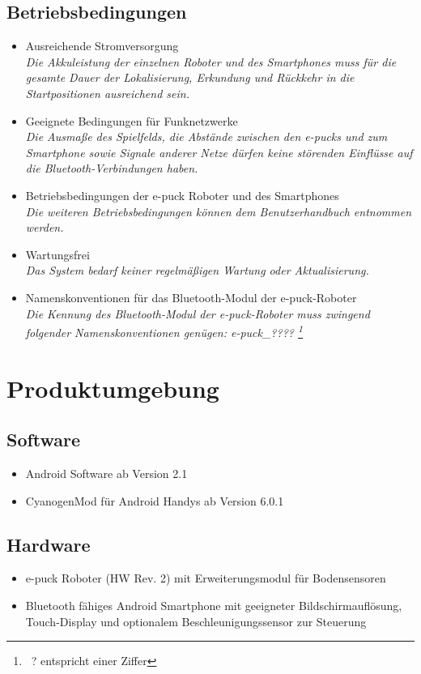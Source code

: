 \documentclass[10pt,a4paper]{article}
\let\oldsection\section
\renewcommand{\section}{\newpage \oldsection}
\begin{document}
		\subsection{Betriebsbedingungen}
			\begin{itemize}
				\item Ausreichende Stromversorgung
					\\ \textsl{Die Akkuleistung der einzelnen Roboter und des Smartphones muss für die gesamte
						Dauer der Lokalisierung, Erkundung und Rückkehr in die Startpositionen ausreichend sein.}
				\item Geeignete Bedingungen für Funknetzwerke
					\\ \textsl{Die Ausmaße des Spielfelds, die Abstände zwischen den e-pucks und zum Smartphone sowie
						Signale anderer Netze dürfen keine störenden Einflüsse auf die Bluetooth-Verbindungen haben.}
				\item Betriebsbedingungen der e-puck Roboter und des Smartphones
					\\ \textsl{Die weiteren Betriebsbedingungen können dem Benutzerhandbuch entnommen werden.}			
				\item Wartungsfrei
					\\ \textsl{Das System bedarf keiner regelmäßigen Wartung oder Aktualisierung.}	
				\item Namenskonventionen für das Bluetooth-Modul der e-puck-Roboter
					\\ \textsl{Die Kennung des Bluetooth-Modul der e-puck-Roboter muss zwingend folgender Namenskonventionen
						genügen: \textit{e-puck\_????} \footnote{ \ ? entspricht einer Ziffer}  }					
			\end{itemize}
	\section{Produktumgebung}
		\subsection{Software}
			\begin{itemize}
				\item Android Software ab Version 2.1
				\item CyanogenMod für Android Handys ab Version 6.0.1
			\end{itemize}
		\subsection{Hardware}
			\begin{itemize}
				\item e-puck Roboter (HW Rev. 2) mit Erweiterungsmodul für Bodensensoren
				\item Bluetooth fähiges Android Smartphone mit geeigneter Bildschirmauflösung, Touch-Display und optionalem
					Beschleunigungssensor zur Steuerung
			\end{itemize}		
\end{document}
